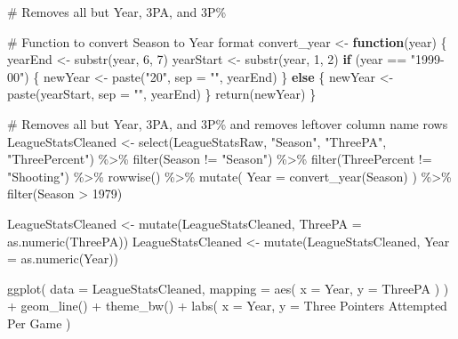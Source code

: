 \documentclass[
  letterpaper,
  DIV=11,
  numbers=noendperiod]{scrartcl}
\newenvironment{Shaded}{\begin{snugshade}}{\end{snugshade}}
\newcommand{\AttributeTok}[1]{\textcolor[rgb]{0.40,0.45,0.13}{#1}}
\newcommand{\CommentTok}[1]{\textcolor[rgb]{0.37,0.37,0.37}{#1}}
\newcommand{\ControlFlowTok}[1]{\textcolor[rgb]{0.00,0.23,0.31}{\textbf{#1}}}
\newcommand{\DecValTok}[1]{\textcolor[rgb]{0.68,0.00,0.00}{#1}}
\newcommand{\FunctionTok}[1]{\textcolor[rgb]{0.28,0.35,0.67}{#1}}
\newcommand{\NormalTok}[1]{\textcolor[rgb]{0.00,0.23,0.31}{#1}}
\newcommand{\OtherTok}[1]{\textcolor[rgb]{0.00,0.23,0.31}{#1}}
\newcommand{\SpecialCharTok}[1]{\textcolor[rgb]{0.37,0.37,0.37}{#1}}
\newcommand{\StringTok}[1]{\textcolor[rgb]{0.13,0.47,0.30}{#1}}
\begin{document}
\begin{Shaded}
\begin{Highlighting}[]
\CommentTok{\# Removes all but Year, 3PA, and 3P\%}

\CommentTok{\# Function to convert Season to Year format}
\NormalTok{convert\_year }\OtherTok{\textless{}{-}} \ControlFlowTok{function}\NormalTok{(year) \{}
\NormalTok{  yearEnd }\OtherTok{\textless{}{-}} \FunctionTok{substr}\NormalTok{(year, }\DecValTok{6}\NormalTok{, }\DecValTok{7}\NormalTok{)}
\NormalTok{  yearStart }\OtherTok{\textless{}{-}} \FunctionTok{substr}\NormalTok{(year, }\DecValTok{1}\NormalTok{, }\DecValTok{2}\NormalTok{)}
  \ControlFlowTok{if}\NormalTok{ (year }\SpecialCharTok{==} \StringTok{"1999{-}00"}\NormalTok{) \{}
\NormalTok{    newYear }\OtherTok{\textless{}{-}} \FunctionTok{paste}\NormalTok{(}\StringTok{"20"}\NormalTok{, }\AttributeTok{sep =} \StringTok{""}\NormalTok{, yearEnd)}
\NormalTok{  \} }\ControlFlowTok{else}\NormalTok{ \{}
\NormalTok{    newYear }\OtherTok{\textless{}{-}} \FunctionTok{paste}\NormalTok{(yearStart, }\AttributeTok{sep =} \StringTok{""}\NormalTok{, yearEnd)}
\NormalTok{  \}}
  \FunctionTok{return}\NormalTok{(newYear)}
\NormalTok{\}}

\CommentTok{\# Removes all but Year, 3PA, and 3P\% and removes leftover column name rows}
\NormalTok{LeagueStatsCleaned }\OtherTok{\textless{}{-}} \FunctionTok{select}\NormalTok{(LeagueStatsRaw, }\StringTok{"Season"}\NormalTok{, }\StringTok{"ThreePA"}\NormalTok{, }\StringTok{"ThreePercent"}\NormalTok{) }\SpecialCharTok{\%\textgreater{}\%}
  \FunctionTok{filter}\NormalTok{(Season }\SpecialCharTok{!=} \StringTok{"Season"}\NormalTok{) }\SpecialCharTok{\%\textgreater{}\%}
  \FunctionTok{filter}\NormalTok{(ThreePercent }\SpecialCharTok{!=} \StringTok{"Shooting"}\NormalTok{) }\SpecialCharTok{\%\textgreater{}\%}
  \FunctionTok{rowwise}\NormalTok{() }\SpecialCharTok{\%\textgreater{}\%}
  \FunctionTok{mutate}\NormalTok{(}
    \AttributeTok{Year =} \FunctionTok{convert\_year}\NormalTok{(Season)}
\NormalTok{  ) }\SpecialCharTok{\%\textgreater{}\%}
  \FunctionTok{filter}\NormalTok{(Season }\SpecialCharTok{\textgreater{}} \DecValTok{1979}\NormalTok{)}

\NormalTok{LeagueStatsCleaned }\OtherTok{\textless{}{-}} \FunctionTok{mutate}\NormalTok{(LeagueStatsCleaned, }\AttributeTok{ThreePA =} \FunctionTok{as.numeric}\NormalTok{(ThreePA))}
\NormalTok{LeagueStatsCleaned }\OtherTok{\textless{}{-}} \FunctionTok{mutate}\NormalTok{(LeagueStatsCleaned, }\AttributeTok{Year =} \FunctionTok{as.numeric}\NormalTok{(Year))}

\FunctionTok{ggplot}\NormalTok{(}
  \AttributeTok{data =}\NormalTok{ LeagueStatsCleaned,}
  \AttributeTok{mapping =} \FunctionTok{aes}\NormalTok{(}
  \AttributeTok{x =}\NormalTok{ Year,}
  \AttributeTok{y =}\NormalTok{ ThreePA}
\NormalTok{  )}
\NormalTok{) }\SpecialCharTok{+} \FunctionTok{geom\_line}\NormalTok{() }\SpecialCharTok{+}
  \FunctionTok{theme\_bw}\NormalTok{() }\SpecialCharTok{+}
  \FunctionTok{labs}\NormalTok{(}
    \AttributeTok{x =} \StringTok{\textquotesingle{}Year\textquotesingle{}}\NormalTok{,}
    \AttributeTok{y =} \StringTok{\textquotesingle{}Three Pointers Attempted Per Game\textquotesingle{}}
\NormalTok{  )}
\end{Highlighting}
\end{Shaded}
\end{document}
